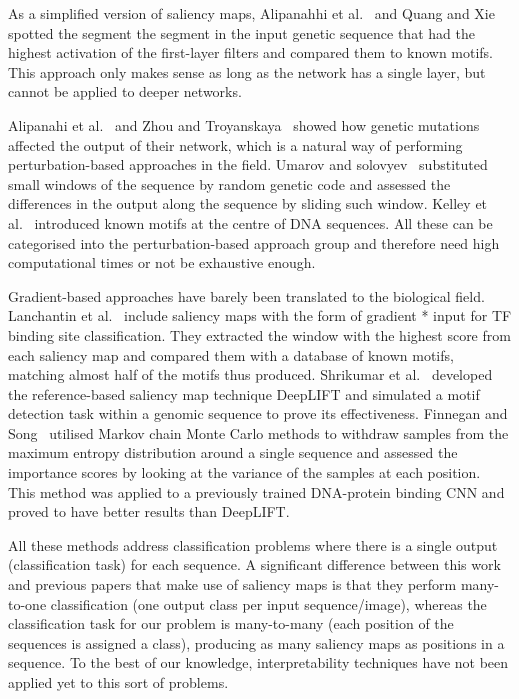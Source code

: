 \documentclass{article}
\begin{document}
As a simplified version of saliency maps, Alipanahhi et al.~\cite{Alipanahi2015} and Quang and Xie~\cite{Quang2016} spotted the segment the segment in the input genetic sequence that had the highest activation of the first-layer filters and compared them to known motifs. This approach only makes sense as long as the network has a single layer, but cannot be applied to deeper networks.

Alipanahi et al.~\cite{Alipanahi2015} and Zhou and Troyanskaya~\cite{Zhou2015} showed how genetic mutations affected the output of their network, which is a natural way of performing perturbation-based approaches in the field. Umarov and solovyev~\cite{Umarov2017} substituted small windows of the sequence by random genetic code and assessed the differences in the output along the sequence by sliding such window. Kelley et al.~\cite{Kelley2016} introduced known motifs at the centre of DNA sequences. All these can be categorised into the perturbation-based approach group and therefore need high computational times or not be exhaustive enough.

Gradient-based approaches have barely been translated to the biological field. Lanchantin et al.~\cite{Lanchantin2016} include saliency maps with the form of gradient * input for TF binding site classification. They extracted the window with the highest score from each saliency map and compared them with a database of known motifs, matching almost half of the motifs thus produced. Shrikumar et al.~\cite{Shrikumar2017} developed the reference-based saliency map technique DeepLIFT and simulated a motif detection task within a genomic sequence to prove its effectiveness. Finnegan and Song~\cite{Finnegan2017} utilised Markov chain Monte Carlo methods to withdraw samples from the maximum entropy distribution around a single sequence and assessed the importance scores by looking at the variance of the samples at each position. This method was applied to a previously trained DNA-protein binding CNN and proved to have better results than DeepLIFT.

All these methods address classification problems where there is a single output (classification task) for each sequence. A significant difference between this work and previous papers that make use of saliency maps is that they perform many-to-one classification (one output class per input sequence/image), whereas the classification task for our problem is many-to-many (each position of the sequences is assigned a class), producing as many saliency maps as positions in a sequence. To the best of our knowledge, interpretability techniques have not been applied yet to this sort of problems.
\end{document}

